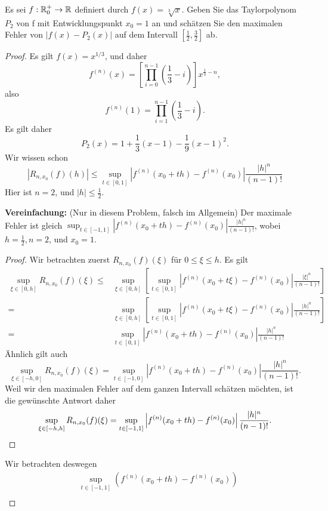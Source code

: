 \begin{Problem}
	Es sei $f : \mathbb{R}_0^+ \to \mathbb{R}$ definiert durch $f (x) = \sqrt[3]{x}$. Geben Sie das Taylorpolynom $P_2$ von f mit Entwicklungspunkt $x_0 = 1$ an und schätzen Sie den maximalen Fehler von $|f(x) - P_2(x)|$ auf dem Intervall $\left[ \frac{1}{2},\frac{3}{2} \right] $ ab.
\end{Problem}
\begin{proof}
	Es gilt $f(x)=x^{1 / 3}$, und daher
	\[
		f^{(n)}(x)=\left[\prod_{i=0}^{n-1} \left( \frac{1}{3}-i \right) \right]x^{\frac{1}{3}-n} 
	,\] 
	also
	\[
		f^{(n)}(1)=\prod_{i=1}^{n-1} \left( \frac{1}{3}-i \right)  
	.\] 
	Es gilt daher
	\[
	P_2(x)=1+\frac{1}{3}(x-1)-\frac{1}{9}(x-1)^2
	.\] 
	Wir wissen schon
	\begin{equation}\tag{5.6.20}
		\left| R_{n,x_0}(f)(h) \right| \le \sup_{t\in[0,1]}\left| f^{(n)}(x_0+th)-f^{(n)}(x_0) \right| \frac{|h|^n}{(n-1)!}
	\end{equation}
	Hier ist $n=2$, und $|h|\le \frac{1}{2}$. 
\begin{tcolorbox}
	\textbf{Vereinfachung:} (Nur in diesem Problem, falsch im Allgemein) Der maximale Fehler ist gleich $\sup_{t\in [-1,1]}\left| f^{(n)}(x_0+th)-f^{(n)}(x_0) \right| \frac{|h|^n}{(n-1)!}$, wobei $h=\frac{1}{2},n=2$, und $x_0=1$.
\begin{proof}
	Wir betrachten zuerst $R_{n,x_0}(f)(\xi)$ f\"{u}r $0\le\xi\le h$. Es gilt
	\begin{align*}
		\sup_{\xi\in [0,h]}R_{n,x_0}(f)(\xi)\le& \sup_{\xi\in [0,h]}\left[\sup_{t\in [0,1]}\left| f^{(n)}(x_0+t\xi)-f^{(n)}(x_0) \right| \frac{|\xi|^n}{(n-1)!}\right]\\
		=& \sup_{\xi\in [0,h]}\left[\sup_{t\in [0,1]}\left| f^{(n)}(x_0+t\xi)-f^{(n)}(x_0) \right| \frac{|h|^n}{(n-1)!} \right] \\
		=&\sup_{t\in [0,1]}\left| f^{(n)}(x_0+th)-f^{(n)}(x_0) \right| \frac{|h|^n}{(n-1)!}
	\end{align*}
	Ähnlich gilt auch
	\[
		\sup_{\xi\in[-h,0]}R_{n,x_0}(f)(\xi)=\sup_{t\in [-1,0]}\left| f^{(n)}(x_0+th)-f^{(n)}(x_0) \right| \frac{|h|^n}{(n-1)!}
	.\] 
	Weil wir den maximalen Fehler auf dem ganzen Intervall schätzen möchten, ist die gewünschte Antwort daher
	\[
		\sup_{\xi\in[-h,h]}R_{n,x_0}(f)(\xi)=\sup_{t\in[-1,1]}\left| f^{(n)}(x_0+th)-f^{(n)}(x_0) \right| \frac{|h|^n}{(n-1)!}
	.\qedhere\] 
\end{proof}
\end{tcolorbox}
Wir betrachten deswegen
\begin{align*}
	&\sup_{t\in [-1,1]}\left( f^{(n)}(x_0+th)-f^{(n)}(x_0) \right)\\

\end{align*}
\end{proof}
